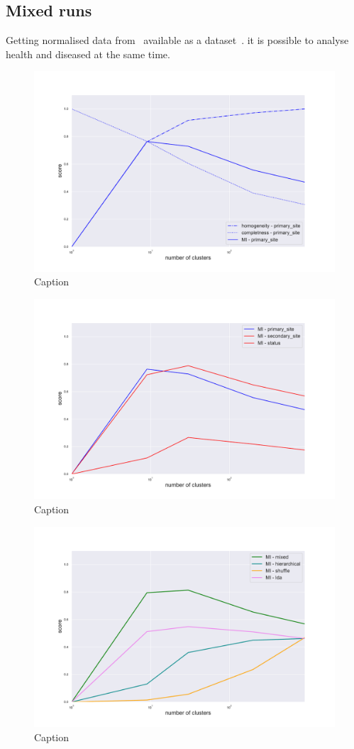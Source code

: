 \subsection{Mixed runs}
Getting normalised data from~\cite{Betel2018} available as a dataset~\cite{Wang2017}. it is possible to analyse health and diseased at the same time.

\begin{figure}[htb!]
    \centering
    \includegraphics[width=0.8\linewidth]{pictures/topic/merged/metric_scores_primarysite.pdf}
    \caption{Caption}
    \label{fig:topic/merged/metric_scores_primarysite}
\end{figure}

\begin{figure}[htb!]
    \centering
    \includegraphics[width=0.8\linewidth]{pictures/topic/merged/metric_scores.pdf}
    \caption{Caption}
    \label{fig:topic/merged/metric_scores}
\end{figure}

\begin{figure}[htb!]
    \centering
    \includegraphics[width=0.8\linewidth]{pictures/topic/merged/metric_scores_all.pdf}
    \caption{Caption}
    \label{fig:topic/merged/metric_scores_all}
\end{figure}